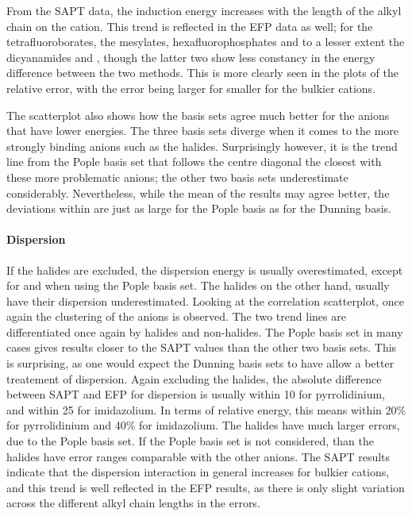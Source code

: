 From the SAPT data, the induction energy increases with the length of the alkyl chain on the cation. 
This trend is reflected in the EFP data as well; for the tetrafluoroborates, the mesylates, hexafluorophosphates and to a lesser extent the dicyanamides and \ntf, though the latter two show less constancy in the energy difference between the two methods.
This is more clearly seen in the plots of the relative error, with the error being larger for smaller for the bulkier cations.

The scatterplot also shows how the basis sets agree much better for the anions that have lower energies.
The three basis sets diverge when it comes to the more strongly binding anions such as the halides.
Surprisingly however, it is the trend line from the Pople basis set that follows the centre diagonal the closest with these more problematic anions; the other two basis sets underestimate considerably.
Nevertheless, while the mean of the results may agree better, the deviations within are just as large for the Pople basis as for the Dunning basis.


\paragraph{Dispersion}
If the halides are excluded, the dispersion energy is usually overestimated, except for \bfl and \pf when using the Pople basis set. 
The halides on the other hand, usually have their dispersion underestimated.
Looking at the correlation scatterplot, once again the clustering of the anions is observed.
The two trend lines are differentiated once again by halides and non-halides. 
The Pople basis set in many cases gives results closer to the SAPT values than the other two basis sets.
This is surprising, as one would expect the Dunning basis sets to have allow a better treatement of dispersion.
Again excluding the halides, the absolute difference between SAPT and EFP for dispersion is usually within 10 \enUnit for pyrrolidinium, and within 25 \enUnit for imidazolium.
In terms of relative energy, this means within 20\% for pyrrolidinium and 40\% for imidazolium.
The halides have much larger errors, due to the Pople basis set. 
If the Pople basis set is not considered, than the halides have error ranges comparable with the other anions.
The SAPT results indicate that the dispersion interaction in general increases for bulkier cations, and this trend is well reflected in the EFP results, as there is only slight variation across the different alkyl chain lengths in the errors. 


